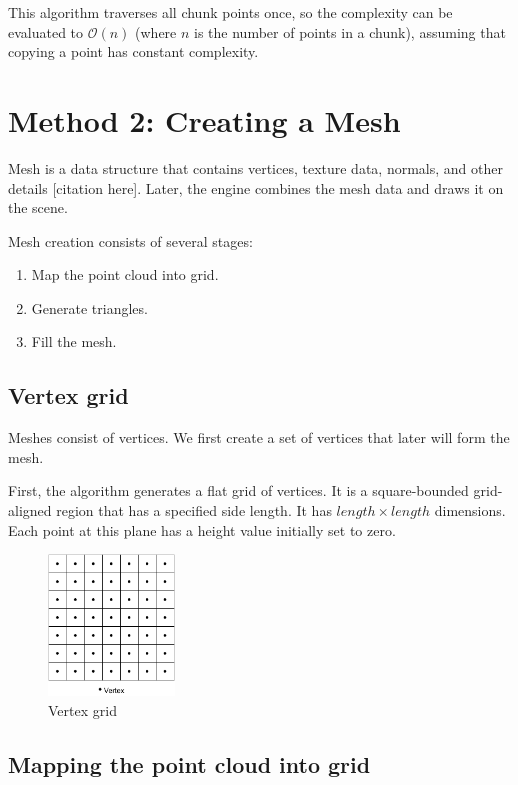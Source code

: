 This algorithm traverses all chunk points once, so the complexity can be evaluated to $\mathcal{O}(n)$ (where $n$ is the number of points in a chunk), assuming that copying a point has constant complexity.


\section{Method 2: Creating a Mesh}
\label{sec:creating_mesh}

Mesh is a data structure that contains vertices, texture data, normals, and other details [citation here]. Later, the engine  combines the mesh data and draws it on the scene.

Mesh creation consists of several stages:

\begin{enumerate}
    \item Map the point cloud into grid.
    \item Generate triangles.
    \item Fill the mesh.
\end{enumerate}


\subsection{Vertex grid}

Meshes consist of vertices. We first create a set of vertices that later will form the mesh.

First, the algorithm generates a flat grid of vertices. It is a square-bounded grid-aligned region that has a specified side length. It has $length \times length$ dimensions. Each point at this plane has a height value initially set to zero.

\begin{figure}[ht]
    \centering
    \includegraphics[width=0.3\textwidth]{vertex-grid.pdf}
    \caption{Vertex grid}
    \label{fig:vertex_grid}
\end{figure}


\subsection{Mapping the point cloud into grid}

